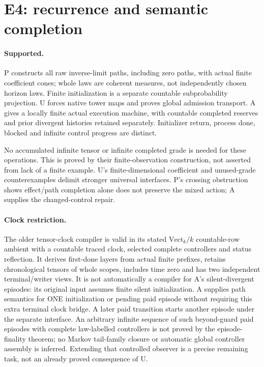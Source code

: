 \documentclass[11pt]{article}
\begin{document}
\section{E4: recurrence and semantic completion}
\paragraph{Supported.} P constructs all raw inverse-limit paths, including zero paths, with actual finite coefficient cones; whole laws are coherent measures, not independently chosen horizon laws. Finite initialization is a separate countable subprobability projection. U forces native tower maps and proves global admission transport. A gives a locally finite actual execution machine, with countable completed reserves and prior divergent histories retained separately. Initializer return, process done, blocked and infinite control progress are distinct.

No accumulated infinite tensor or infinite completed grade is needed for these operations. This is proved by their finite-observation construction, not asserted from lack of a finite example. U's finite-dimensional coefficient and unused-grade counterexamples delimit stronger universal interfaces. P's crossing obstruction shows effect/path completion alone does not preserve the mixed action; A supplies the changed-control repair.

\paragraph{Clock restriction.} The older tensor-clock compiler is valid in its stated $\mathrm{Vect}_k/k$ countable-row ambient with a countable traced clock, selected complete controllers and status reflection. It derives first-done layers from actual finite prefixes, retains chronological tensors of whole scopes, includes time zero and has two independent terminal/writer views. It is not automatically a compiler for A's silent-divergent episodes: its original input assumes finite silent initialization. A supplies path semantics for ONE initialization or pending paid episode without requiring this extra terminal clock bridge. A later paid transition starts another episode under the separate interface. An arbitrary infinite sequence of such beyond-guard paid episodes with complete law-labelled controllers is not proved by the episode-finality theorem; no Markov tail-family closure or automatic global controller assembly is inferred. Extending that controlled observer is a precise remaining task, not an already proved consequence of U.
\end{document}
